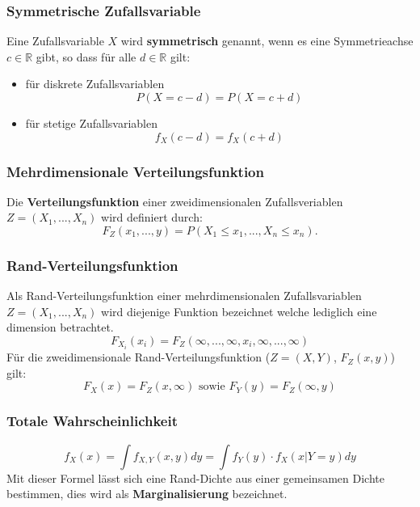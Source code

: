 \documentclass[12pt]{article}
\begin{document}
\subsubsection{Symmetrische Zufallsvariable}
Eine Zufallsvariable $X$ wird \textbf{symmetrisch} genannt, wenn es eine Symmetrieachse $c \in \mathbb{R}$ gibt, so dass für alle $d\in\mathbb{R}$ gilt:
\begin{itemize}
	\item für diskrete Zufallsvariablen 
	\begin{equation*}
		P(X=c-d) = P(X=c+d)
	\end{equation*}
	\item für stetige Zufallsvariablen
	\begin{equation*}
		f_X(c-d)=f_X(c+d)
	\end{equation*}
\end{itemize}
\subsubsection{Mehrdimensionale Verteilungsfunktion}
Die \textbf{Verteilungsfunktion} einer zweidimensionalen Zufallsveriablen $Z = (X_1,...,X_n)$ wird definiert durch:
\begin{equation*}
	F_Z(x_1,...,y)=P(X_1\leq x_1,..., X_n\leq x_n).
\end{equation*}
\subsubsection{Rand-Verteilungsfunktion}
Als Rand-Verteilungsfunktion einer mehrdimensionalen Zufallsvariablen $Z=(X_1,...,X_n)$ wird diejenige Funktion bezeichnet welche lediglich eine dimension betrachtet.
\begin{equation*}
	F_{X_i}(x_i)=F_Z(\infty,...,\infty,x_i,\infty,...,\infty)
\end{equation*}
Für die zweidimensionale Rand-Verteilungsfunktion ($Z=(X,Y)$, $F_Z(x,y)$) gilt:
\begin{equation*}
	F_X(x)=F_Z(x,\infty) \text{ sowie } F_Y(y) = F_Z(\infty,y)
\end{equation*}
\subsubsection{Totale Wahrscheinlichkeit}
\begin{equation*}
	f_X(x) = \int f_{X,Y}(x,y)dy = \int f_Y(y) \cdot f_X(x|Y=y) dy
\end{equation*}
Mit dieser Formel lässt sich eine Rand-Dichte aus einer gemeinsamen Dichte bestimmen, dies wird als \textbf{Marginalisierung} bezeichnet.
\end{document}
